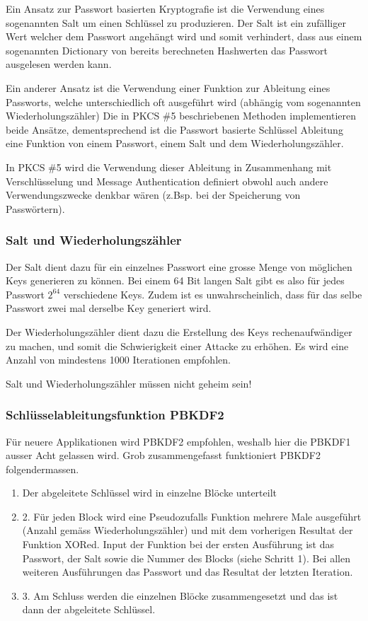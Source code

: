 \documentclass[10pt,a4paper]{article}
\begin{document}
Ein Ansatz zur Passwort basierten Kryptografie ist die Verwendung eines sogenannten Salt
um einen Schlüssel zu produzieren. Der Salt ist ein zufälliger Wert welcher dem Passwort
angehängt wird und somit verhindert, dass aus einem sogenannten Dictionary von bereits
berechneten Hashwerten das Passwort ausgelesen werden kann. 

Ein anderer Ansatz ist die Verwendung einer Funktion zur Ableitung eines Passworts, welche
unterschiedlich oft ausgeführt wird (abhängig vom sogenannten Wiederholungszähler) Die in
PKCS \#5 beschriebenen Methoden implementieren beide Ansätze, dementsprechend ist die
Passwort basierte Schlüssel Ableitung eine Funktion von einem Passwort, einem Salt und dem
Wiederholungszähler.

In PKCS \#5 wird die Verwendung dieser Ableitung in Zusammenhang mit Verschlüsselung und
Message Authentication definiert obwohl auch andere Verwendungszwecke denkbar wären
(z.Bsp.  bei der Speicherung von Passwörtern).

\subsubsection{Salt und Wiederholungszähler}
Der Salt dient dazu für ein einzelnes Passwort eine grosse Menge von möglichen Keys
generieren zu können. Bei einem 64 Bit langen Salt gibt es also für jedes Passwort $2^64$
verschiedene Keys. Zudem ist es unwahrscheinlich, dass für das selbe Passwort zwei mal
derselbe Key generiert wird.

Der Wiederholungszähler dient dazu die Erstellung des Keys rechenaufwändiger zu machen,
und somit die Schwierigkeit einer Attacke zu erhöhen. Es wird eine Anzahl von mindestens
1000 Iterationen empfohlen.

Salt und Wiederholungszähler müssen nicht geheim sein!

\subsubsection{Schlüsselableitungsfunktion PBKDF2}
Für neuere Applikationen wird PBKDF2 empfohlen, weshalb hier die PBKDF1 ausser Acht
gelassen wird. Grob zusammengefasst funktioniert PBKDF2 folgendermassen.
\begin{enumerate}
    \item Der abgeleitete Schlüssel wird in einzelne Blöcke unterteilt
    \item 2. Für jeden Block wird eine Pseudozufalls Funktion mehrere Male ausgeführt
        (Anzahl gemäss Wiederholungszähler) und mit dem vorherigen Resultat der Funktion
        XORed. Input der Funktion bei der ersten Ausführung ist das Passwort, der Salt
        sowie die Nummer des Blocks (siehe Schritt 1). Bei allen weiteren Ausführungen das
        Passwort und das Resultat der letzten Iteration.
    \item 3. Am Schluss werden die einzelnen Blöcke zusammengesetzt und das ist dann der
        abgeleitete Schlüssel.
\end{enumerate}
\end{document}
